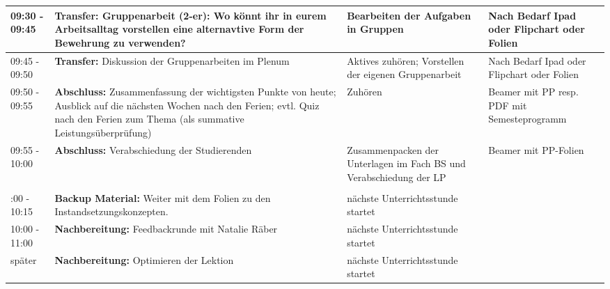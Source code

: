 \documentclass[
11pt,
captions=tableheading,
headsepline,
footsepline, 
captions=tableheading,
parskip=half-,
]{scrartcl}
\begin{document}
\begin{landscape}
\begin{longtable}{@{}l|p{9cm}p{7.5cm}p{3.5cm}@{}}
    \midrule
    09:30 - 09:45 & \textbf{Transfer:} Gruppenarbeit (2-er): Wo könnt ihr in eurem Arbeitsalltag vorstellen eine alternavtive Form der Bewehrung zu verwenden? & Bearbeiten der Aufgaben in Gruppen & Nach Bedarf Ipad oder Flipchart oder Folien\\
    \midrule
    09:45 - 09:50 & \textbf{Transfer:} Diskussion der Gruppenarbeiten im Plenum  & Aktives zuhören; Vorstellen der eigenen Gruppenarbeit & Nach Bedarf Ipad oder Flipchart oder Folien\\
    \midrule
    09:50 - 09:55 & \textbf{Abschluss:} Zusammenfassung der wichtigsten Punkte von heute; Ausblick auf die nächsten Wochen nach den Ferien; evtl. Quiz nach den Ferien zum Thema (als summative Leistungsüberprüfung)& Zuhören & Beamer mit PP resp. PDF mit Semesteprogramm\\
    \midrule
    09:55 - 10:00 & \textbf{Abschluss:} Verabschiedung der Studierenden & Zusammenpacken der Unterlagen im Fach BS und Verabschiedung der LP & Beamer mit PP-Folien\\
    \midrule
    \\ \addlinespace
    \midrule
    10:00 - 10:15 & \textbf{Backup Material:} Weiter mit dem Folien zu den Instandsetzungskonzepten. & nächste Unterrichtsstunde startet & {}\\
    \hline
    10:00 - 11:00 & \textbf{Nachbereitung:} Feedbackrunde mit Natalie Räber & nächste Unterrichtsstunde startet & {}\\
    \hline
    später & \textbf{Nachbereitung:} Optimieren der Lektion & nächste Unterrichtsstunde startet & {}\\
    \bottomrule
\end{longtable}
\end{landscape}
\clearpage
\end{document}

